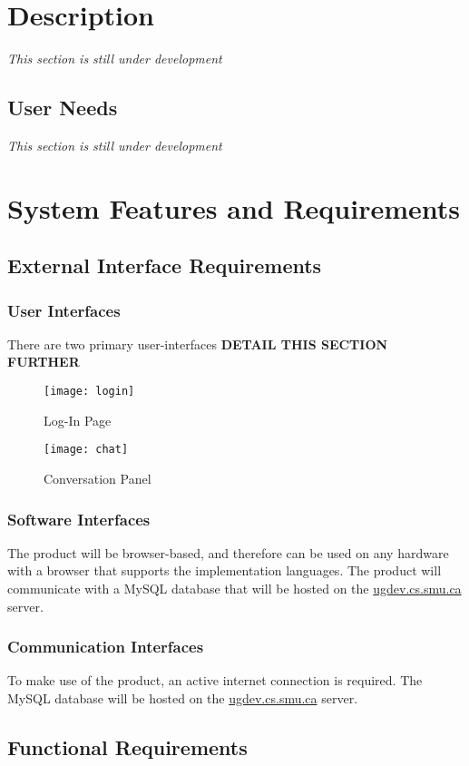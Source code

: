 \documentclass[11pt]{article}
\begin{document}
\section{Description}
\textit{This section is still under development}\\\blindtext
\subsection{User Needs}
\textit{This section is still under development}\\\blindtext
\section{System Features and Requirements}
\subsection{External Interface Requirements}
\subsubsection{User Interfaces}
There are two primary user-interfaces \textbf{DETAIL THIS SECTION FURTHER}

\begin{figure}[!htb]
  \texttt{[image: login]}
  \caption{Log-In Page}
\end{figure}
\begin{figure}
    \texttt{[image: chat]}
    \caption{Conversation Panel}
\end{figure}
\FloatBarrier

\subsubsection{Software Interfaces}
The product will be browser-based, and therefore can be used on any hardware with a browser that
supports the implementation languages. The product will communicate with a MySQL database that will
be hosted on the \url{ugdev.cs.smu.ca} server.

\subsubsection{Communication Interfaces}
To make use of the product, an active internet connection is required. The MySQL database will be
hosted on the \url{ugdev.cs.smu.ca} server.

\subsection{Functional Requirements}
\end{document}
